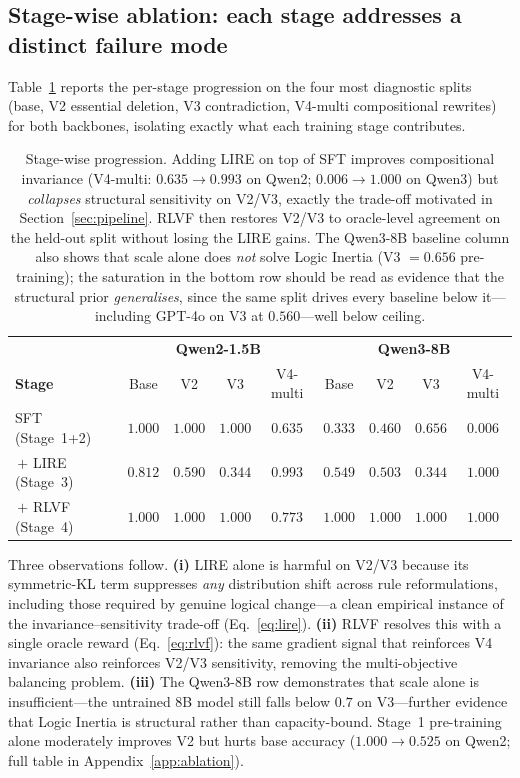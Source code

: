 \documentclass{article} %
\begin{document}
\subsection{Stage-wise ablation: each stage addresses a distinct failure mode}
\label{sec:ablation-stagewise}
Table~\ref{tab:stage_wise} reports the per-stage progression on the four most diagnostic splits (base, V2 essential deletion, V3 contradiction, V4-multi compositional rewrites) for both backbones, isolating exactly what each training stage contributes.

\begin{table}[h]
\centering\small
\caption{Stage-wise progression. Adding LIRE on top of SFT improves compositional invariance (V4-multi: $0.635{\to}0.993$ on Qwen2; $0.006{\to}1.000$ on Qwen3) but \emph{collapses} structural sensitivity on V2/V3, exactly the trade-off motivated in Section~\ref{sec:pipeline}. RLVF then restores V2/V3 to oracle-level agreement on the held-out split without losing the LIRE gains. The Qwen3-8B baseline column also shows that scale alone does \emph{not} solve Logic Inertia (V3 $=0.656$ pre-training); the saturation in the bottom row should be read as evidence that the structural prior \emph{generalises}, since the same split drives every baseline below it---including GPT-4o on V3 at $0.560$---well below ceiling.}
\label{tab:stage_wise}
\begin{tabular}{l|cccc|cccc}
\toprule
& \multicolumn{4}{c|}{\textbf{Qwen2-1.5B}} & \multicolumn{4}{c}{\textbf{Qwen3-8B}} \\
\textbf{Stage}            & Base & V2   & V3   & V4-multi & Base & V2   & V3   & V4-multi \\
\midrule
SFT (Stage~1+2)           & $1.000$ & $1.000$ & $1.000$ & $0.635$  & $0.333$ & $0.460$ & $0.656$ & $0.006$  \\
\,$+$ LIRE (Stage~3)      & $0.812$ & $0.590$ & $0.344$ & $\mathbf{0.993}$ & $0.549$ & $0.503$ & $0.344$ & $\mathbf{1.000}$ \\
\,$+$ RLVF (Stage~4)      & $\mathbf{1.000}$ & $\mathbf{1.000}$ & $\mathbf{1.000}$ & $0.773$ & $\mathbf{1.000}$ & $\mathbf{1.000}$ & $\mathbf{1.000}$ & $\mathbf{1.000}$ \\
\bottomrule
\end{tabular}
\end{table}

Three observations follow. \textbf{(i)} LIRE alone is harmful on V2/V3 because its symmetric-KL term suppresses \emph{any} distribution shift across rule reformulations, including those required by genuine logical change---a clean empirical instance of the invariance--sensitivity trade-off (Eq.~\ref{eq:lire}). \textbf{(ii)} RLVF resolves this with a single oracle reward (Eq.~\ref{eq:rlvf}): the same gradient signal that reinforces V4 invariance also reinforces V2/V3 sensitivity, removing the multi-objective balancing problem. \textbf{(iii)} The Qwen3-8B row demonstrates that scale alone is insufficient---the untrained $8$B model still falls below $0.7$ on V3---further evidence that Logic Inertia is structural rather than capacity-bound. Stage~1 pre-training alone moderately improves V2 but hurts base accuracy ($1.000{\to}0.525$ on Qwen2; full table in Appendix~\ref{app:ablation}).
\end{document}
